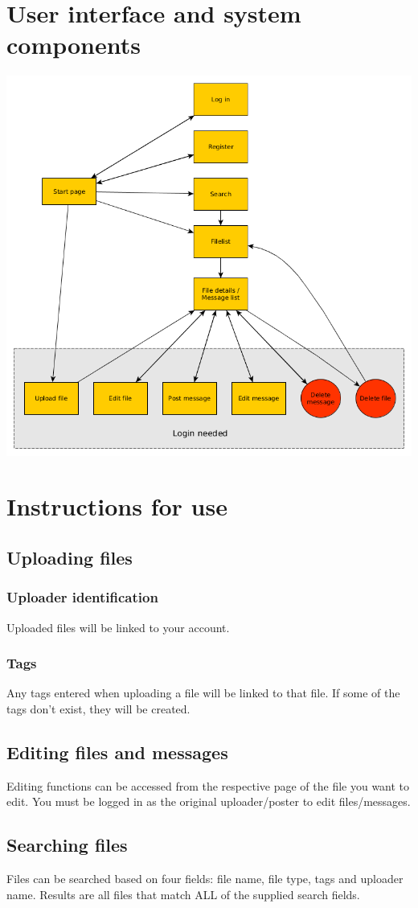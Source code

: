 \documentclass[10pt,a4paper]{article}
\begin{document}
\section{User interface and system components}
\includegraphics[scale=0.7]{diagrams/pageflow.png}

\section{Instructions for use}
\subsection{Uploading files}
\subsubsection{Uploader identification}
Uploaded files will be linked to your account. 
\subsubsection{Tags}
Any tags entered when uploading a file will be linked to that file. If some of the tags don't exist, they will be created.
\subsection{Editing files and messages}
Editing functions can be accessed from the respective page of the file you want to edit. You must be logged in as the original uploader/poster to edit files/messages.

\subsection{Searching files}
Files can be searched based on four fields: file name, file type, tags and uploader name. Results are all files that match ALL of the supplied search fields. 
\end{document}

